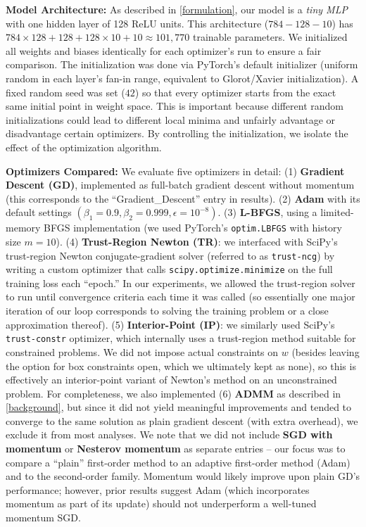\documentclass[12pt]{article}
\begin{document}
\textbf{Model Architecture:} As described in \cref{formulation}, our model is a \emph{tiny MLP} with one hidden layer of 128 ReLU units. This architecture ($784-128-10$) has $784\times128 + 128 + 128\times10 + 10 \approx 101,770$ trainable parameters. We initialized all weights and biases identically for each optimizer’s run to ensure a fair comparison. The initialization was done via PyTorch’s default initializer (uniform random in each layer’s fan-in range, equivalent to Glorot/Xavier initialization). A fixed random seed was set ($42$) so that every optimizer starts from the exact same initial point in weight space. This is important because different random initializations could lead to different local minima and unfairly advantage or disadvantage certain optimizers. By controlling the initialization, we isolate the effect of the optimization algorithm.

\textbf{Optimizers Compared:} We evaluate five optimizers in detail: (1) \textbf{Gradient Descent (GD)}, implemented as full-batch gradient descent without momentum (this corresponds to the “Gradient\_Descent” entry in results). (2) \textbf{Adam} \cite{Kingma2015Adam} with its default settings $(\beta_1=0.9, \beta_2=0.999, \epsilon=10^{-8})$. (3) \textbf{L-BFGS}, using a limited-memory BFGS implementation (we used PyTorch’s \texttt{optim.LBFGS} with history size $m=10$). (4) \textbf{Trust-Region Newton (TR)}: we interfaced with SciPy’s trust-region Newton conjugate-gradient solver (referred to as \texttt{trust-ncg}) by writing a custom optimizer that calls \texttt{scipy.optimize.minimize} on the full training loss each “epoch.” In our experiments, we allowed the trust-region solver to run until convergence criteria each time it was called (so essentially one major iteration of our loop corresponds to solving the training problem or a close approximation thereof). (5) \textbf{Interior-Point (IP)}: we similarly used SciPy’s \texttt{trust-constr} optimizer, which internally uses a trust-region method suitable for constrained problems. We did not impose actual constraints on $w$ (besides leaving the option for box constraints open, which we ultimately kept as none), so this is effectively an interior-point variant of Newton’s method on an unconstrained problem. For completeness, we also implemented (6) \textbf{ADMM} as described in \cref{background}, but since it did not yield meaningful improvements and tended to converge to the same solution as plain gradient descent (with extra overhead), we exclude it from most analyses. We note that we did not include \textbf{SGD with momentum} or \textbf{Nesterov momentum} as separate entries – our focus was to compare a “plain” first-order method to an adaptive first-order method (Adam) and to the second-order family. Momentum would likely improve upon plain GD’s performance; however, prior results suggest Adam (which incorporates momentum as part of its update) should not underperform a well-tuned momentum SGD.
\end{document}
